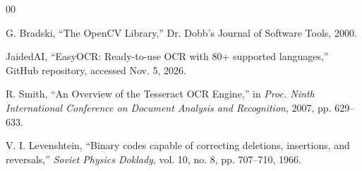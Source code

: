 \documentclass[conference]{IEEEtran}
\begin{document}
\begin{thebibliography}{00}

G. Bradski, ``The OpenCV Library,'' Dr. Dobb's Journal of Software Tools,
2000.

JaidedAI, ``EasyOCR: Ready-to-use OCR with 80+ supported languages,''
GitHub repository, accessed Nov. 5, 2026.

R. Smith, ``An Overview of the Tesseract OCR Engine,'' in
\emph{Proc. Ninth International Conference on Document Analysis and
Recognition}, 2007, pp. 629--633.

V. I. Levenshtein, ``Binary codes capable of correcting deletions, insertions,
and reversals,'' \emph{Soviet Physics Doklady}, vol. 10, no. 8, pp. 707--710,
1966.

\end{thebibliography}
\end{document}
